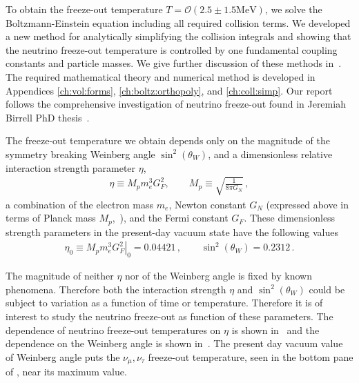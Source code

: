 To obtain the freeze-out temperature $T=\mathcal{O}(2.5\pm1.5\mathrm{MeV})$, we solve the Boltzmann-Einstein equation including all required collision terms. 
We developed a new method for analytically simplifying the collision integrals and showing that the neutrino freeze-out temperature is controlled by one fundamental coupling constants and particle masses. We give further discussion of these methods in~. The required mathematical theory and numerical method is developed in Appendices \ref{ch:vol:forms}, \ref{ch:boltz:orthopoly}, and \ref{ch:coll:simp}. Our report follows the comprehensive investigation of neutrino freeze-out found in Jeremiah Birrell PhD thesis~\cite{Birrell:2014ona}.

The freeze-out temperature we obtain depends only on the magnitude of the symmetry breaking Weinberg angle $\sin^2(\theta_W)$, and a dimensionless relative interaction strength parameter $\eta$,
\begin{align}\label{etaCTY}
\eta\equiv M_p m_e^3 G_F^2, \qquad M_p\equiv\sqrt{\frac{1}{8\pi G_N}}\,, 
\end{align}
a combination of the electron mass $m_e$, Newton constant $G_N$ (expressed above in terms of Planck mass $M_p$,~), and the Fermi constant $G_F$. These dimensionless strength parameters in the present-day vacuum state have the following values
\begin{align}\label{eta0CTY}
\eta_0\equiv \left.M_p m_e^3 G_F^2\right|_0 = 0.04421\,, \qquad \sin^2(\theta_W)=0.2312\,.
\end{align}

The magnitude of neither $\eta$ nor of the Weinberg angle is fixed by known phenomena. Therefore both the interaction strength $\eta$ and $\sin^2(\theta_W)$ could be subject to variation as a function of time or temperature. Therefore it is of interest to study the neutrino freeze-out as function of these parameters. The dependence of neutrino freeze-out temperatures on $\eta$ is shown in~ and the dependence on the Weinberg angle is shown in~. The present day vacuum value of Weinberg angle puts the $\nu_\mu,\nu_\tau$ freeze-out temperature, seen in the bottom pane of , near its maximum value.
 
